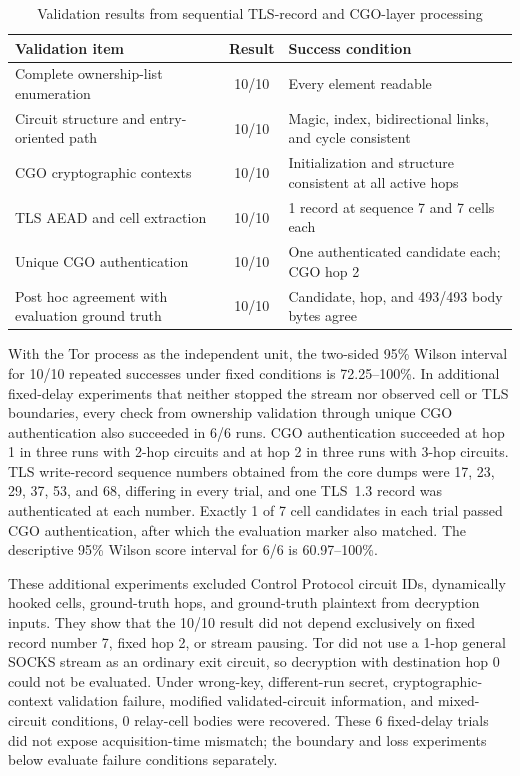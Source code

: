 \documentclass[10pt,a4paper]{article}
\begin{document}
\begin{table}[!tbp]
\centering
\caption{Validation results from sequential TLS-record and CGO-layer processing}
\label{tab:full}
\small
\begin{tabularx}{\linewidth}{YcL{31mm}}
\toprule
Validation item & Result & Success condition \\
\midrule
Complete ownership-list enumeration & 10/10 & Every element readable \\
Circuit structure and entry-oriented path & 10/10 & Magic, index, bidirectional links, and cycle consistent \\
CGO cryptographic contexts & 10/10 & Initialization and structure consistent at all active hops \\
TLS AEAD and cell extraction & 10/10 & 1 record at sequence 7 and 7 cells each \\
Unique CGO authentication & 10/10 & One authenticated candidate each; CGO hop 2 \\
Post hoc agreement with evaluation ground truth & 10/10 & Candidate, hop, and 493/493 body bytes agree \\
\bottomrule
\end{tabularx}
\end{table}

With the Tor process as the independent unit, the two-sided 95\% Wilson interval for 10/10 repeated successes under fixed conditions is 72.25--100\%.
In additional fixed-delay experiments that neither stopped the stream nor observed cell or TLS boundaries, every check from ownership validation through unique CGO authentication also succeeded in 6/6 runs. CGO authentication succeeded at hop 1 in three runs with 2-hop circuits and at hop 2 in three runs with 3-hop circuits. TLS write-record sequence numbers obtained from the core dumps were 17, 23, 29, 37, 53, and 68, differing in every trial, and one TLS~1.3 record was authenticated at each number. Exactly 1 of 7 cell candidates in each trial passed CGO authentication, after which the evaluation marker also matched. The descriptive 95\% Wilson score interval for 6/6 is 60.97--100\%.

These additional experiments excluded Control Protocol circuit IDs, dynamically hooked cells, ground-truth hops, and ground-truth plaintext from decryption inputs. They show that the 10/10 result did not depend exclusively on fixed record number 7, fixed hop 2, or stream pausing. Tor did not use a 1-hop general SOCKS stream as an ordinary exit circuit, so decryption with destination hop 0 could not be evaluated. Under wrong-key, different-run secret, cryptographic-context validation failure, modified validated-circuit information, and mixed-circuit conditions, 0 relay-cell bodies were recovered. These 6 fixed-delay trials did not expose acquisition-time mismatch; the boundary and loss experiments below evaluate failure conditions separately.
\end{document}
